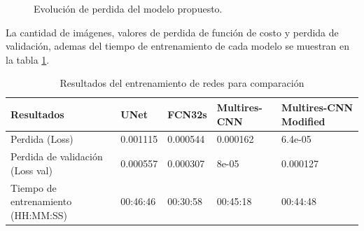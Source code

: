 \documentclass[10pt,letterpaper]{article}
\begin{document}
%

\begin{figure}[H]
      \begin{center}
        \caption{Evolución de perdida del modelo propuesto.}
        \label{tif125}
      \end{center}
\end{figure}


La cantidad de imágenes, valores de perdida de función de costo y perdida de validación, ademas del tiempo de entrenamiento de cada modelo se muestran en la tabla \ref{resultadoscomparacion}.

\begin{table}[H]
\begin{center}
\begin{tabular}{ p{1.8cm}  p{1.5cm}  p{1.5cm}  p{2.2cm}  p{2.4cm} }
\hline
Resultados & UNet & FCN32s & Multires-CNN & Multires-CNN Modified\\	
\hline
Perdida (Loss) & 0.001115  & 0.000544 & 0.000162 & 6.4e-05 \\
\hline
Perdida de validación (Loss val) & 0.000557 & 0.000307 & 8e-05 & 0.000127 \\
\hline
Tiempo de entrenamiento (HH:MM:SS) & 00:46:46 & 00:30:58 & 00:45:18 & 00:44:48 \\
\hline
\end{tabular}
\caption{Resultados del entrenamiento de redes para comparación}
\label{resultadoscomparacion}
\end{center}
\end{table}
\end{document}
